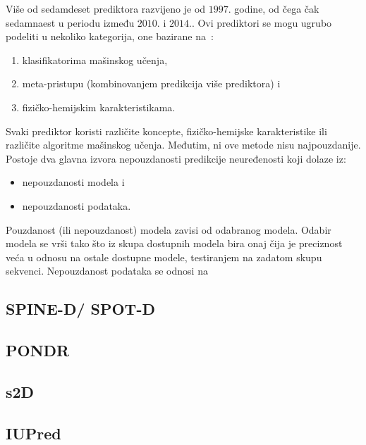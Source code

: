 Više od sedamdeset prediktora razvijeno je od $1997.$ godine, od čega čak sedamnaest u periodu između $2010.$ i $2014.$. Ovi prediktori se mogu ugrubo podeliti u nekoliko kategorija, one bazirane na~\cite{PredictorsOverview}:
\begin{enumerate}
\item klasifikatorima mašinskog učenja,
\item meta-pristupu (kombinovanjem predikcija više prediktora) i 
\item fizičko-hemijskim karakteristikama.
\end{enumerate}

Svaki prediktor koristi različite koncepte, fizičko-hemijske karakteristike ili različite algoritme mašinskog učenja. Međutim, ni ove metode nisu najpouzdanije. Postoje dva glavna izvora nepouzdanosti predikcije neuređenosti koji dolaze iz:
\begin{itemize}
\item nepouzdanosti modela i
\item nepouzdanosti podataka.
\end{itemize}

Pouzdanost (ili nepouzdanost) modela zavisi od odabranog modela. Odabir modela se vrši tako što iz skupa dostupnih modela bira onaj čija je preciznost veća u odnosu na ostale dostupne modele, testiranjem na zadatom skupu sekvenci.
Nepouzdanost podataka se odnosi na  ~\cite{MolBioSyst}


\subsection{SPINE-D/ SPOT-D}



\subsection{PONDR}

\subsection{s2D}
\subsection{IUPred}


